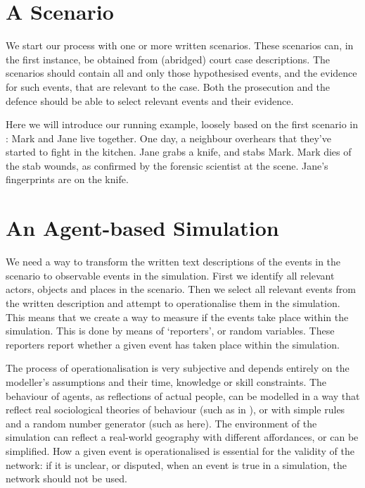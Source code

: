 \section{A Scenario}
We start our process with one or more written scenarios. These scenarios can, in the first instance, be obtained from (abridged) court case descriptions. The scenarios should contain all and only those hypothesised events, and the evidence for such events, that are relevant to the case. Both the prosecution and the defence should be able to select relevant events and their evidence. 


\begin{example}
Here we will introduce our running example, loosely based on the first scenario in \citep{vlek2015}: Mark and Jane live together. One day, a neighbour overhears that they've started to fight in the kitchen. Jane grabs a knife, and stabs Mark. Mark dies of the stab wounds, as confirmed by the forensic scientist at the scene. Jane's fingerprints are on the knife.
\end{example}

\section{An Agent-based Simulation}


We need a way to transform the written text descriptions of the events in the scenario to observable events in the simulation. First we identify all relevant actors, objects and places in the scenario. Then we select all relevant events from the written description and attempt to operationalise them in the simulation. This means that we create a way to measure if the events take place within the simulation. This is done by means of `reporters', or random variables. These reporters report whether a given event has taken place within the simulation. 

The process of operationalisation is very subjective and depends entirely on the modeller's assumptions and their time, knowledge or skill constraints. The behaviour of agents, as reflections of actual people, can be modelled in a way that reflect real sociological theories of behaviour (such as in \citet{gerritsen2015}), or with simple rules and a random number generator (such as here). The environment of the simulation can reflect a real-world geography with different affordances, or can be simplified. How a given event is operationalised is essential for the validity of the network: if it is unclear, or disputed, when an event is true in a simulation, the network should not be used.

